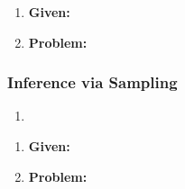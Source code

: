 \begin{example} 
    \begin{enumerate}
        \item \textbf{Given:}
        \item \textbf{Problem:}
    \end{enumerate}
\end{example}
\newpage

\subsubsection{Inference via Sampling}
\begin{process}
    \begin{enumerate}
        \item 
    \end{enumerate}
\end{process}

\begin{example}
    \begin{enumerate}
        \item \textbf{Given:}
        \item \textbf{Problem:}
    \end{enumerate}
\end{example}